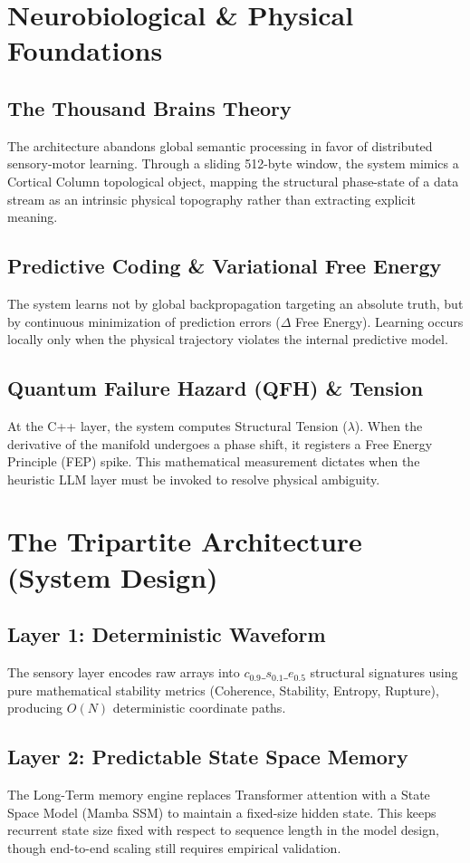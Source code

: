 \documentclass[11pt,twocolumn]{article}
\begin{document}
\section{Neurobiological \& Physical Foundations}

\subsection{The Thousand Brains Theory}
The architecture abandons global semantic processing in favor of distributed sensory-motor learning. Through a sliding 512-byte window, the system mimics a Cortical Column topological object, mapping the structural phase-state of a data stream as an intrinsic physical topography rather than extracting explicit meaning.

\subsection{Predictive Coding \& Variational Free Energy}
The system learns not by global backpropagation targeting an absolute truth, but by continuous minimization of prediction errors ($\Delta$ Free Energy). Learning occurs locally only when the physical trajectory violates the internal predictive model.

\subsection{Quantum Failure Hazard (QFH) \& Tension}
At the C++ layer, the system computes Structural Tension ($\lambda$). When the derivative of the manifold undergoes a phase shift, it registers a Free Energy Principle (FEP) spike. This mathematical measurement dictates when the heuristic LLM layer must be invoked to resolve physical ambiguity.

\section{The Tripartite Architecture (System Design)}

\subsection{Layer 1: Deterministic Waveform}
The sensory layer encodes raw arrays into $c_{0.9}\_s_{0.1}\_e_{0.5}$ structural signatures using pure mathematical stability metrics (Coherence, Stability, Entropy, Rupture), producing $O(N)$ deterministic coordinate paths.

\subsection{Layer 2: Predictable State Space Memory}
The Long-Term memory engine replaces Transformer attention with a State Space Model (Mamba SSM) to maintain a fixed-size hidden state. This keeps recurrent state size fixed with respect to sequence length in the model design, though end-to-end scaling still requires empirical validation.
\end{document}

